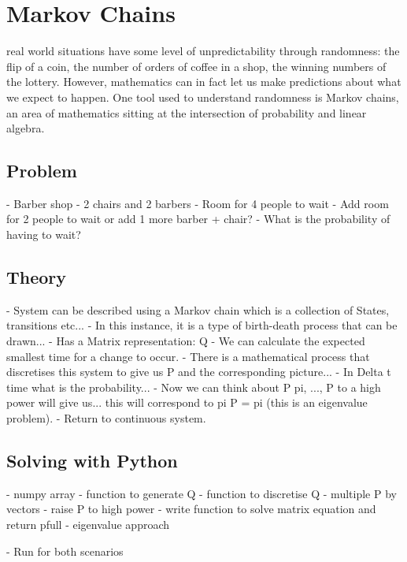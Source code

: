 \chapter[Markov Chains]{Markov Chains}

 real world situations have some level of
unpredictability through randomness: the flip of a coin, the number of orders of
coffee in a shop, the winning numbers of the lottery. However, mathematics can
in fact let us make predictions about what we expect to happen. One tool used to
understand randomness is Markov chains, an area of mathematics sitting at the
intersection of probability and linear algebra.

\section{Problem}\label{sec:problem}

- Barber shop
- 2 chairs and 2 barbers
- Room for 4 people to wait
- Add room for 2 people to wait or add 1 more barber + chair?
- What is the probability of having to wait?

\section{Theory}\label{sec:theory}

- System can be described using a Markov chain which is a collection of States,
transitions etc...
- In this instance, it is a type of birth-death process that can be drawn...
- Has a Matrix representation: Q
- We can calculate the expected smallest time for a change to occur.
- There is a mathematical process that discretises this system to give us P and
the corresponding picture...
- In Delta t time what is the probability...
- Now we can think about P pi, ..., P to a high power will give us...  this will
correspond to pi P = pi (this is an eigenvalue problem).
- Return to continuous system.

\section{Solving with Python}\label{sec:solving-with-python}

- numpy array
- function to generate Q
- function to discretise Q
- multiple P by vectors
- raise P to high power
- write function to solve matrix equation and return pfull - eigenvalue approach

- Run for both scenarios



